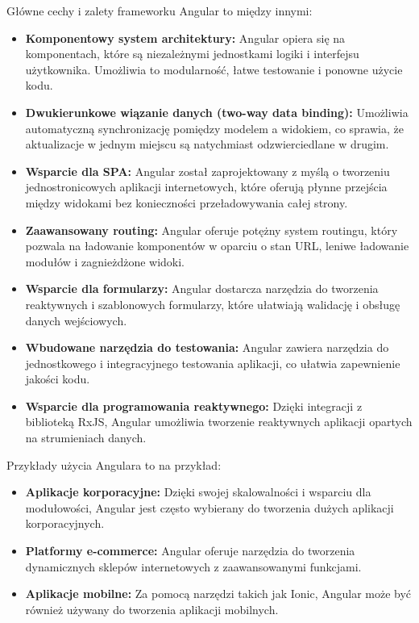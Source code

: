 Główne cechy i zalety frameworku Angular to między innymi:
\begin{itemize}
\item \textbf{Komponentowy system architektury:} Angular opiera się na komponentach, które są niezależnymi jednostkami logiki i interfejsu użytkownika. Umożliwia to modularność, łatwe testowanie i ponowne użycie kodu.

\item \textbf{Dwukierunkowe wiązanie danych (two-way data binding):} Umożliwia automatyczną synchronizację pomiędzy modelem a widokiem, co sprawia, że aktualizacje w jednym miejscu są natychmiast odzwierciedlane w drugim.

\item \textbf{Wsparcie dla SPA:} Angular został zaprojektowany z myślą o tworzeniu jednostronicowych aplikacji internetowych, które oferują płynne przejścia między widokami bez konieczności przeładowywania całej strony.

\item \textbf{Zaawansowany routing:} Angular oferuje potężny system routingu, który pozwala na ładowanie komponentów w oparciu o stan URL, leniwe ładowanie modułów i zagnieżdżone widoki.

\item \textbf{Wsparcie dla formularzy:} Angular dostarcza narzędzia do tworzenia reaktywnych i szablonowych formularzy, które ułatwiają walidację i obsługę danych wejściowych.

\item \textbf{Wbudowane narzędzia do testowania:} Angular zawiera narzędzia do jednostkowego i integracyjnego testowania aplikacji, co ułatwia zapewnienie jakości kodu.

\item \textbf{Wsparcie dla programowania reaktywnego:} Dzięki integracji z biblioteką RxJS, Angular umożliwia tworzenie reaktywnych aplikacji opartych na strumieniach danych.
\end{itemize}

Przykłady użycia Angulara to na przykład:
\begin{itemize}
\item \textbf{Aplikacje korporacyjne:} Dzięki swojej skalowalności i wsparciu dla modułowości, Angular jest często wybierany do tworzenia dużych aplikacji korporacyjnych.

\item \textbf{Platformy e-commerce:} Angular oferuje narzędzia do tworzenia dynamicznych sklepów internetowych z zaawansowanymi funkcjami.

\item \textbf{Aplikacje mobilne:} Za pomocą narzędzi takich jak Ionic, Angular może być również używany do tworzenia aplikacji mobilnych.
\end{itemize}

